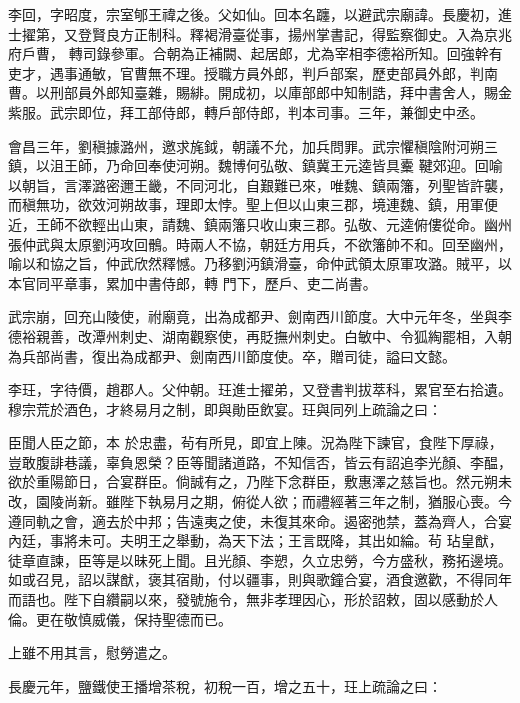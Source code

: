 \begin{pinyinscope}
 李回，字昭度，宗室郇王禕之後。父如仙。回本名躔，以避武宗廟諱。長慶初，進士擢第，又登賢良方正制科。釋褐滑臺從事，揚州掌書記，得監察御史。入為京兆府戶曹，
 轉司錄參軍。合朝為正補闕、起居郎，尤為宰相李德裕所知。回強幹有吏才，遇事通敏，官曹無不理。授職方員外郎，判戶部案，歷吏部員外郎，判南曹。以刑部員外郎知臺雜，賜緋。開成初，以庫部郎中知制誥，拜中書舍人，賜金紫服。武宗即位，拜工部侍郎，轉戶部侍郎，判本司事。三年，兼御史中丞。



 會昌三年，劉稹據潞州，邀求旄鉞，朝議不允，加兵問罪。武宗懼稹陰附河朔三鎮，以沮王師，乃命回奉使河朔。魏博何弘敬、鎮冀王元逵皆具櫜
 鞬郊迎。回喻以朝旨，言澤潞密邇王畿，不同河北，自艱難已來，唯魏、鎮兩籓，列聖皆許襲，而稹無功，欲效河朔故事，理即太悖。聖上但以山東三郡，境連魏、鎮，用軍便近，王師不欲輕出山東，請魏、鎮兩籓只收山東三郡。弘敬、元逵俯僂從命。幽州張仲武與太原劉沔攻回鶻。時兩人不協，朝廷方用兵，不欲籓帥不和。回至幽州，喻以和協之旨，仲武欣然釋憾。乃移劉沔鎮滑臺，命仲武領太原軍攻潞。賊平，以本官同平章事，累加中書侍郎，轉
 門下，歷戶、吏二尚書。



 武宗崩，回充山陵使，祔廟竟，出為成都尹、劍南西川節度。大中元年冬，坐與李德裕親善，改潭州刺史、湖南觀察使，再貶撫州刺史。白敏中、令狐綯罷相，入朝為兵部尚書，復出為成都尹、劍南西川節度使。卒，贈司徒，謚曰文懿。



 李玨，字待價，趙郡人。父仲朝。玨進士擢弟，又登書判拔萃科，累官至右拾遺。穆宗荒於酒色，才終易月之制，即與勛臣飲宴。玨與同列上疏論之曰：



 臣聞人臣之節，本
 於忠盡，茍有所見，即宜上陳。況為陛下諫官，食陛下厚祿，豈敢腹誹巷議，辜負恩榮？臣等聞諸道路，不知信否，皆云有詔追李光顏、李醖，欲於重陽節日，合宴群臣。倘誠有之，乃陛下念群臣，敷惠澤之慈旨也。然元朔未改，園陵尚新。雖陛下執易月之期，俯從人欲；而禮經著三年之制，猶服心喪。今遵同軌之會，適去於中邦；告遠夷之使，未復其來命。遏密弛禁，蓋為齊人，合宴內廷，事將未可。夫明王之舉動，為天下法；王言既降，其出如綸。茍
 玷皇猷，徒章直諫，臣等是以昧死上聞。且光顏、李愬，久立忠勞，今方盛秋，務拓邊境。如或召見，詔以謀猷，褒其宿勛，付以疆事，則與歌鐘合宴，酒食邀歡，不得同年而語也。陛下自纘嗣以來，發號施令，無非孝理因心，形於詔敕，固以感動於人倫。更在敬慎威儀，保持聖德而已。



 上雖不用其言，慰勞遣之。



 長慶元年，鹽鐵使王播增茶稅，初稅一百，增之五十，玨上疏論之曰：




\end{pinyinscope}
